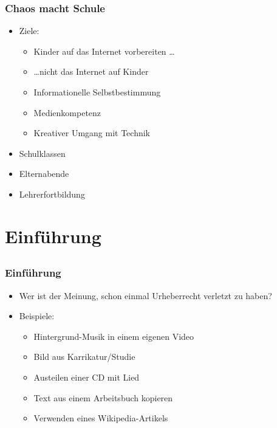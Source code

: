 \documentclass{beamer}
\begin{document}
\begin{frame}
    \frametitle{Chaos macht Schule}
    \begin{itemize}
        \item<2->Ziele:
            \begin{itemize}
                \item<3-> Kinder auf das Internet vorbereiten \ldots
                \item<4-> \ldots nicht das Internet auf Kinder
                \item<5-> Informationelle Selbstbestimmung
                \item<6-> Medienkompetenz
                \item<7-> Kreativer Umgang mit Technik
            \end{itemize}
        \item<8-> Schulklassen
        \item<9-> Elternabende
        \item<10-> Lehrerfortbildung
    \end{itemize}
\end{frame}

\section{Einführung}
\subsection{}

\begin{frame}
    \frametitle{Einführung}
    \begin{itemize}
        \item<2-> Wer ist der Meinung, schon einmal Urheberrecht verletzt zu haben?
        \item<3-> Beispiele:
        \begin{itemize}
          \item<2-> Hintergrund-Musik in einem eigenen Video
          \item<2-> Bild aus Karrikatur/Studie
          \item<2-> Austeilen einer CD mit Lied
          \item<2-> Text aus einem Arbeitsbuch kopieren
          \item<2-> Verwenden eines Wikipedia-Artikels
        \end{itemize}
    \end{itemize}
\end{frame}
\end{document}
